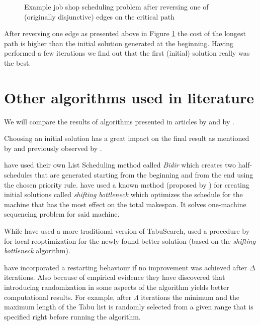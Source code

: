 \documentclass[14pt]{article}
\begin{document}
\begin{figure}[H]
  \centering
  \def\svgwidth{0.5\columnwidth}
  
  \caption{Example job shop scheduling problem after reversing one of (originally disjunctive) edges on the critical path}
  \label{ts-sol-3}
\end{figure}

After reversing one edge as presented above in Figure \ref{ts-sol-3} the cost of the longest path is higher than the initial solution generated at the beginning.
Having performed a few iterations we find out that the first (initial) solution really was the best.

\section{Other algorithms used in literature}\label{other-algs}

We will compare the results of algorithms presented in articles by \citet{amico-trubian} and by \citet{pezzella}.

Choosing an initial solution has a great impact on the final result as mentioned by \citet{pezzella} and previously observed by .

\citet{amico-trubian} have used their own List Scheduling method called \textit{Bidir} which creates two half-schedules that are generated starting from the beginning and from the end using the chosen priority rule.
\citet{pezzella} have used a known method (proposed by \citet{adams}) for creating initial solutions called \textit{shifting bottleneck} which optimizes the schedule for the machine that has the most effect on the total makespan. It solves one-machine sequencing problem for said machine.

While \citet{amico-trubian} have used a more traditional version of TabuSearch, \citet{pezzella} used a procedure by \citet{carlier} for local reoptimization for the newly found better solution (based on the \textit{shifting bottleneck} algorithm).

\citet{amico-trubian} have incorporated a restarting behaviour if no improvement was achieved after $\Delta$ iterations. Also because of empirical evidence they have discovered that introducing randomization in some aspects of the algorithm yields better computational results. For example, after $\Lambda$ iterations the minimum and the maximum length of the Tabu list is randomly selected from a given range that is specified right before running the algorithm.
\end{document}
